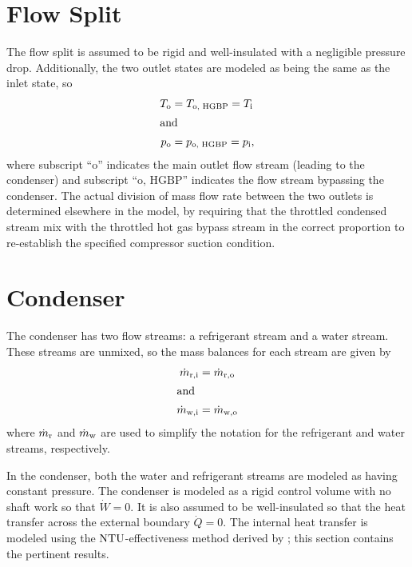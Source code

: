 \section{Flow Split} \label{sec:FlowSplit}
The flow split is assumed to be rigid and well-insulated with a negligible pressure drop.
Additionally, the two outlet states are modeled as being the same as the inlet state, so
\begin{align}
  T_{\text{o}} &= T_{\text{o, HGBP}} = T_{\text{i}} \\
  \shortintertext{and}
  p_{\text{o}} &= p_{\text{o, HGBP}} = p_{\text{i}},
\end{align}
where subscript ``$\text{o}$'' indicates the main outlet flow stream (leading to the condenser)
and subscript ``$\text{o, HGBP}$'' indicates the flow stream bypassing the condenser.
The actual division of mass flow rate between the two outlets is determined elsewhere in the model, 
by requiring that the throttled condensed stream mix with the throttled hot gas bypass
stream in the correct proportion to re-establish the specified compressor suction condition.

\section{Condenser} \label{sec:Condenser}
The condenser has two flow streams: a refrigerant stream and a water stream.
These streams are unmixed, so the mass balances for each stream are given by
\begin{align}
  \dot{m}_{\rfr,\inl} &= \dot{m}_{\rfr,\out} \\%
  \shortintertext{and}
  \dot{m}_{\wat,\inl} &= \dot{m}_{\wat,\out} %
\end{align}
where $\dot{m}_{\text{r}}$ and $\dot{m}_{\text{w}}$ are used to simplify the notation
for the refrigerant and water streams, respectively.

In the condenser, both the water and refrigerant streams are modeled as having constant pressure.
The condenser is modeled as a rigid control volume with no shaft work so that $\dot{W}=0$.
It is also assumed to be well-insulated so that the heat transfer across the external boundary $\dot{Q}=0$.
The internal heat transfer is modeled using the $\mathrm{NTU}$-effectiveness method 
derived by \textcite{incropera2007}; this section contains the pertinent results.

